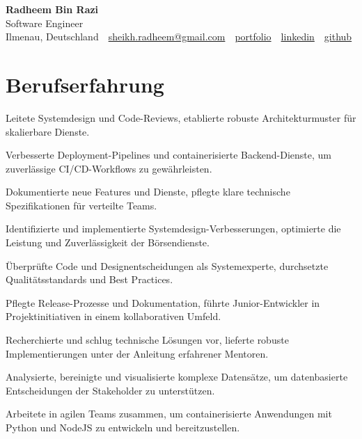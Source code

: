 \documentclass[11pt,a4paper]{resume}
\makeatletter
\newcommand{\Portfolio}{https://radheem.github.io/my-cv}
\newcommand{\PortfolioText}{portfolio}
\newcommand{\GitHub}{https://github.com/radheem}
\newcommand{\LinkedIn}{https://www.linkedin.com/in/radheem-razi}
\newcommand{\Email}{sheikh.radheem@gmail.com}
\makeatother
\begin{document}
\clearpage
{}

\begin{center}
  {\huge\bfseries Radheem Bin Razi}\\[3pt]
  {\large Software Engineer}\\[6pt]
  \small
  Ilmenau, Deutschland \,\textbar\,
  \href{mailto:\Email}{\Email} \,\textbar\,
  \href{\Portfolio}{\PortfolioText} \,\textbar\,
  \href{\LinkedIn}{linkedin} \,\textbar\,
  \href{\GitHub}{github}
\end{center}
\vspace{2pt}

\section{Berufserfahrung}

\bullets
  \item Leitete Systemdesign und Code-Reviews, etablierte robuste Architekturmuster für skalierbare Dienste.
  \item Verbesserte Deployment-Pipelines und containerisierte Backend-Dienste, um zuverlässige CI/CD-Workflows zu gewährleisten.
  \item Dokumentierte neue Features und Dienste, pflegte klare technische Spezifikationen für verteilte Teams.
\bulletsend
\vspace{3pt}
\bullets
  \item Identifizierte und implementierte Systemdesign-Verbesserungen, optimierte die Leistung und Zuverlässigkeit der Börsendienste.
  \item Überprüfte Code und Designentscheidungen als Systemexperte, durchsetzte Qualitätsstandards und Best Practices.
  \item Pflegte Release-Prozesse und Dokumentation, führte Junior-Entwickler in Projektinitiativen in einem kollaborativen Umfeld.
\bulletsend
\vspace{3pt}
\bullets
  \item Recherchierte und schlug technische Lösungen vor, lieferte robuste Implementierungen unter der Anleitung erfahrener Mentoren.
  \item Analysierte, bereinigte und visualisierte komplexe Datensätze, um datenbasierte Entscheidungen der Stakeholder zu unterstützen.
  \item Arbeitete in agilen Teams zusammen, um containerisierte Anwendungen mit Python und NodeJS zu entwickeln und bereitzustellen.
\bulletsend
\vspace{3pt}
\end{document}
